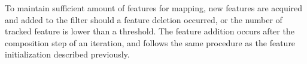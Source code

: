 To maintain sufficient amount of features for mapping, new features 
are acquired and added to the filter should a feature deletion 
occurred, or the number of tracked feature is lower than a threshold. The 
feature addition occurs after the composition step of an 
iteration, and follows the same procedure as the feature
initialization described previously. 



